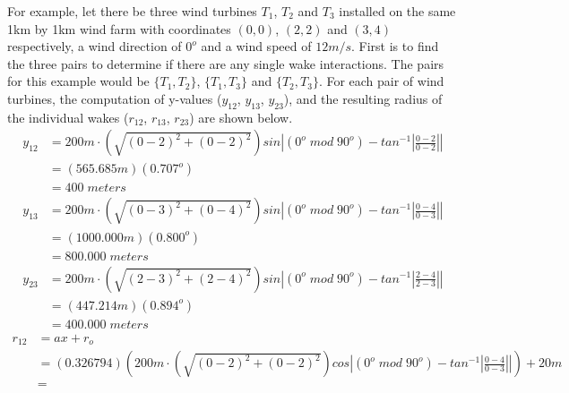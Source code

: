     For example, let there be three wind turbines $T_1$, $T_2$ and $T_3$ installed on the same 1km by 1km wind farm with coordinates $(0,0)$, $(2,2)$ and $(3,4)$ respectively, a wind direction of $0^o$ and a wind speed of $12m/s$. First is to find the three pairs to determine if there are any single wake interactions. The pairs for this example would be $\{T_1,T_2\}$, $\{T_1,T_3\}$ and $\{T_2,T_3\}$. For each pair of wind turbines, the computation of  y-values ($y_{12}$, $y_{13}$, $y_{23}$), and the resulting radius of the individual wakes ($r_{12}$, $r_{13}$, $r_{23}$) are shown below.
    \begin{align*}
        y_{12}
        &=200m\cdot \left( \sqrt{(0-2)^2+(0-2)^2} \right)sin \left| (0^o\;mod\;90^o) - tan^{-1}\left|\frac{0-2}{0-2}\right| \right| \\
        &=\left( 565.685m \right)(0.707^o) \\
        &= 400\;meters
    \end{align*}
    \begin{align*}
        y_{13}
        &=200m\cdot \left( \sqrt{(0-3)^2+(0-4)^2} \right)sin \left| (0^o\;mod\;90^o) - tan^{-1}\left|\frac{0-4}{0-3}\right| \right| \\
        &=\left( 1000.000m \right)(0.800^o) \\
        &= 800.000\;meters
    \end{align*}
    \begin{align*}
        y_{23}
        &=200m\cdot \left( \sqrt{(2-3)^2+(2-4)^2} \right)sin \left| (0^o\;mod\;90^o) - tan^{-1}\left|\frac{2-4}{2-3}\right| \right| \\
        &=\left( 447.214m \right)(0.894^o) \\
        &= 400.000\;meters
    \end{align*}
    \begin{align*}
        r_{12}
        &= ax+r_o \\
        &= (0.326794)\left( 200m\cdot \left( \sqrt{(0-2)^2+(0-2)^2} \right)cos \left| (0^o\;mod\;90^o) - tan^{-1}\left|\frac{0-4}{0-3}\right| \right| \right) + 20m \\
        &=
    \end{align*}
    